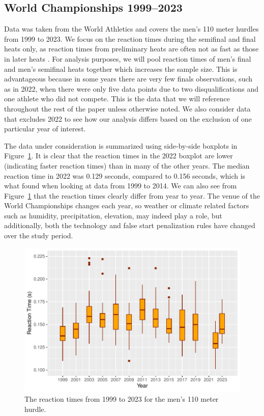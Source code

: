 \documentclass[12pt, letterpaper]{article}
\begin{document}
\subsection{World Championships 1999--2023}\label{sec:dataworld}


Data was taken from the World Athletics 
and covers the men's 110 meter hurdles from 1999 to 2023.
We focus on the reaction times during the 
semifinal and final heats only, as reaction times from preliminary heats are 
often not as fast as those in later heats \citep[e.g.,][]{zhang2021correlation}. 
For analysis purposes, we will pool reaction times of men's final and 
men's semifinal heats together which increases the sample size. This is 
advantageous because in some years there are very few finals observations, such
as in 2022, when there were only five data points due to two disqualifications 
and one athlete who did not compete. This is the data that we will reference
throughout the rest of the paper unless otherwise noted. We also consider data 
that excludes 2022 to see how our analysis differs based on the exclusion of one
particular year of interest.


The data under consideration is summarized using side-by-side boxplots in 
Figure~\ref{fig:Boxplot}. It is clear that the reaction times in the 2022
boxplot are lower (indicating faster reaction times) than in many of the other
years. The median reaction time in 2022 was 0.129 seconds,  compared to 0.156
seconds, which is what \citet{brosnan2017effects} found when looking at data
from 1999 to 2014. We can also see from Figure~\ref{fig:Boxplot} that the 
reaction times clearly differ from year to year. The venue of the World 
Championships changes each year, so weather or climate related factors such as 
humidity, precipitation, elevation, may indeed play a role, but additionally,
both the technology and false start penalization rules have changed over the 
study period.


\begin{figure}[tbp]
  \centering
  \includegraphics{Boxplot}
  \caption{The reaction times from 1999 to 2023 for the men's 110 meter hurdle.}
  \label{fig:Boxplot}
\end{figure}
\end{document}
